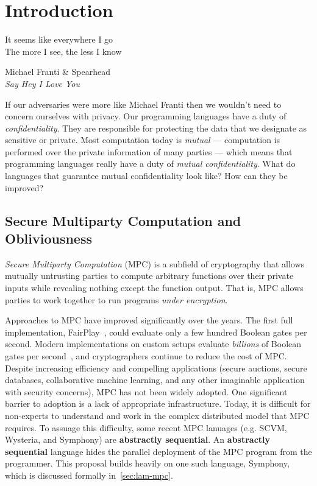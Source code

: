 \chapter{Introduction}
\label{ch:intro}

\epigraph{It seems like everywhere I go \\
          The more I see, the less I know}{
            Michael Franti \& Spearhead \\
            \emph{Say Hey I Love You}}

If our adversaries were more like Michael Franti then we wouldn't need to concern ourselves with privacy.
Our programming languages have a duty of \emph{confidentiality}. They are responsible for protecting the
data that we designate as sensitive or private. Most computation today is \emph{mutual} --- computation
is performed over the private information of many parties --- which means that programming languages really
have a duty of \emph{mutual confidentiality}. What do languages that guarantee mutual confidentiality look
like? How can they be improved?

\section{Secure Multiparty Computation and Obliviousness}
\label{sec:intro}

\emph{Secure Multiparty Computation} (MPC) is a subfield of cryptography
that allows mutually untrusting parties to compute arbitrary functions over their private inputs while revealing nothing
except the function output. That is, MPC allows parties to work together to run programs \emph{under encryption}.

Approaches to MPC have improved significantly over the years. The first full implementation, FairPlay~\cite{todo}, could evaluate
only a few hundred Boolean gates per second. Modern implementations on custom setups evaluate \emph{billions} of Boolean gates per
second~\cite{todo}, and cryptographers continue to reduce the cost of MPC. Despite increasing efficiency and compelling applications
(secure auctions, secure databases, collaborative machine learning, and any other imaginable application with security concerns),
MPC has not been widely adopted. One significant barrier to adoption is a lack of appropriate infrastructure. Today, it is difficult
for non-experts to understand and work in the complex distributed model that MPC requires. To assuage this difficulty, some recent
MPC lanuages (e.g. SCVM, Wysteria, and Symphony) are \textbf{abstractly sequential}. An \textbf{abstractly sequential} language hides
the parallel deployment of the MPC program from the programmer. This proposal builds heavily on one such language, Symphony, which is
discussed formally in~\cref{sec:lam-mpc}.

